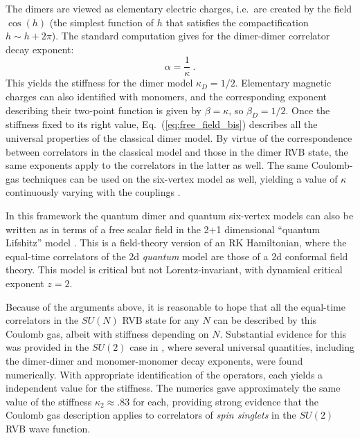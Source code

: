 \documentclass[11pt]{iopart}
\begin{document}
The dimers are viewed as elementary electric charges, i.e.\ are created by the field $\cos(h)$ (the simplest function of $h$ that satisfies the compactification $h\sim h+2\pi$). The standard computation \cite{Nienhuis} gives for the dimer-dimer correlator decay exponent:
\begin{equation}
 \alpha=\frac{1}{\kappa}\ .
\end{equation}
This yields the stiffness for the dimer model $\kappa_D=1/2$. Elementary magnetic charges can also identified with monomers, and the corresponding exponent describing their two-point function is given by $\beta=\kappa$, so $\beta_D=1/2$.
Once the stiffness fixed to its right value, Eq.~(\ref{eq:free_field_bis}) describes all the universal properties of the classical dimer model. By virtue of the correspondence between correlators in the classical model and those in the dimer RVB state, the same exponents apply to the correlators in the latter as well. 
The same Coulomb-gas techniques can be used on the six-vertex model as well, yielding a value of $\kappa$ continuously varying with the couplings \cite{Nienhuis}.


In this framework the quantum dimer and quantum six-vertex models can also be written as in terms of a free scalar field in the 2+1 dimensional ``quantum Lifshitz'' model \cite{Henley,QuantumLifshitz}. This is a field-theory version of an RK Hamiltonian, where the equal-time correlators of the 2d {\em quantum} model are those of a 2d conformal field theory. This model is critical but not Lorentz-invariant, with dynamical critical exponent $z=2$.

Because of the arguments above, it is reasonable to hope that all the equal-time correlators in the $SU(N)$ RVB state for any $N$ can be described by this Coulomb gas, albeit with stiffness depending on $N$. Substantial evidence for this was provided in the $SU(2)$ case in \cite{RVB2}, where several universal quantities, including the dimer-dimer and monomer-monomer decay exponents, were found numerically. With appropriate identification of the operators, each yields a independent value for the stiffness.  The numerics gave approximately the same value of the stiffness $\kappa_{2}\approx .83$ for each, providing strong evidence that the Coulomb gas description applies to correlators of {\em spin singlets} in the $SU(2)$ RVB wave function. 
\end{document}
